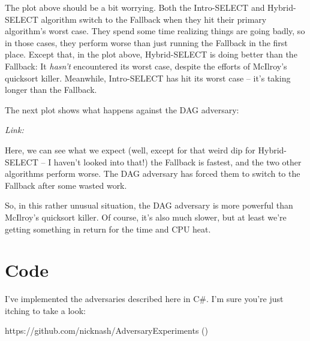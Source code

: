 \documentclass[11pt]{article}
\begin{document}
The plot above should be a bit worrying. Both the Intro-SELECT and Hybrid-SELECT algorithm switch to the Fallback when they hit their primary algorithm's worst case. They spend some time realizing things are going badly, so in those cases, they perform worse than just running the Fallback in the first place. Except that, in the plot above, Hybrid-SELECT is doing better than the Fallback: It \emph{hasn't} encountered its worst case, despite the efforts of McIlroy's quicksort killer. Meanwhile, Intro-SELECT has hit its worst case -- it's taking longer than the Fallback.

The next plot shows what happens against the DAG adversary:

\begin{center}\end{center}

\textit{Link: }\texttt{}

Here, we can see what we expect (well, except for that weird dip for Hybrid-SELECT -- I haven't looked into that!) the Fallback is fastest, and the two other algorithms perform worse. The DAG adversary has forced them to switch to the Fallback after some wasted work.

So, in this rather unusual situation, the DAG adversary is more powerful than McIlroy's quicksort killer. Of course, it's also much slower, but at least we're getting something in return for the time and CPU heat.
\section{Code}

I've implemented the adversaries described here in C\#. I'm sure you're just itching to take a look:

https://github.com/nicknash/AdversaryExperiments (\texttt{})
\end{document}
